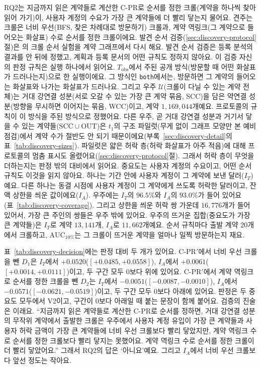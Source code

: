 RQ2는 지금까지 읽은 계약들로 계산한 \mbox{C-PR}로 순서를 정한 크롤(계약을 하나씩 찾아 읽어 가기)이, 사용자 계정의 수요가 가장 큰 계약들에 더 빨리 닿는지 물어요. 견주는 크롤은 너비 우선(BFS, 찾은 차례대로 방문하기) 크롤과, 계약 역링크(그 계약으로 들어오는 화살표) 수로 순서를 정한 크롤이에요. 발견 순서 검증(\ref{sec:discovery-protocol}절)은 \textcite{cho1998crawling}의 크롤 순서 실험을 계약 그래프에서 다시 해요. 발견 순서 검증은 등록 분석의 결과를 안 뒤에 정했고, 계획과 등록 문서의 어떤 규칙도 정하지 않아요. 이 검증 자신의 판정 규칙은 실행 하나에서 읽어요. $T_{\mathrm{obs}}$에서 주된 공개 방식(방문할 때 어떤 화살표가 드러나는지)으로 한 실행이에요. 그 방식인 \texttt{both}에서는, 방문하면 그 계약의 들어오는 화살표와 나가는 화살표가 드러나요. 그리고 우주 $\mathcal{U}$(크롤이 다닐 수 있는 계약 전체)는 거대 강연결 성분(서로 오갈 수 있는 가장 큰 계약 묶음, SCC)을 담은 약연결 성분(방향을 무시하면 이어지는 묶음, WCC)이고, 계약 $1{,}169{,}044$개예요. 프로토콜의 규칙이 이 방식을 주된 방식으로 정했어요. 다른 우주, 곧 거대 강연결 성분과 거기서 닿을 수 있는 계약들($\mathrm{SCC}\cup\mathrm{OUT}$)은 $t_1$의 구조 파일럿(무게 없이 그래프 모양만 본 예비 점검)에서 계약 수가 절반도 안 되기 때문이에요(부록~\ref{sec:discovery-detail}의 표~\ref{tab:discovery-sizes}). 파일럿은 얇은 허락 층(허락 화살표가 아주 적음)에 대해 프로토콜의 멈춤 표시도 올렸어요(\ref{sec:discovery-protocol}절). 그래서 허락 층이 무엇을 더하는지는 판정 밖의 대비에서 읽어요. 중요도는 사용자 계정의 수요이고, 어떤 순서 규칙도 이것을 읽지 않아요. 하나는 기간 안에 사용자 계정이 그 계약에 보낸 달러($I_T$)예요. 다른 하나는 동결 시점에 사용자 계정이 그 계약에게 쓰도록 허락한 달러이고, 잔액 상한을 씌운 값이에요($I_A$). 우주에는 $I_T$의 $96.5\%$와 $I_A$의 $93.0\%$가 들어 있어요(표~\ref{tab:discovery-coverage}). 그리고 상한을 씌운 허락 쌍 가운데 $16{,}776$개가 들어 있어서, 가장 큰 주인의 쌍들은 우주 밖에 있어요. 우주의 뜨거운 집합(중요도가 가장 큰 계약들)은 $I_T$로 계약 $13{,}141$개, $I_A$로 $11{,}662$개예요. 순서 규칙마다 출발 계약 $20$개에서 크롤하고, $\mathrm{AUC}_{10\%}$는 그 크롤이 뜨거운 계약을 얼마나 일찍 방문하는지 재요.

표~\ref{tab:discovery-decision}에는 판정 대비 두 개가 있어요. \mbox{C-PR}$'$에서 너비 우선 크롤을 뺀 $D_1$은 $I_T$에서 $+0.0520$($[+0.0485,+0.0558]$), $I_A$에서 $+0.0061$($[+0.0014,+0.0111]$)이고, 두 구간 모두 0보다 위에 있어요. \mbox{C-PR}$'$에서 계약 역링크로 순서를 정한 크롤을 뺀 $D_2$는 $I_T$에서 $-0.0051$($[-0.0087,-0.0010]$), $I_A$에서 $-0.0571$($[-0.0621,-0.0519]$)이고, 두 구간 모두 0보다 아래에 있어요. 판정은 두 중요도 모두에서 V2이고, 구간이 0보다 아래일 때 붙는 문장이 함께 붙어요. 검증의 진술은 이래요. “지금까지 읽은 계약들로 계산한 \mbox{C-PR}로 순서를 정하면, 거대 강연결 성분의 무작위 계약에서 출발한 크롤은 우주에서 사용자 계정 유입이 가장 큰 계약들과 사용자 허락 금액이 가장 큰 계약들에 너비 우선 크롤보다 빨리 닿았지만, 계약 역링크 수로 순서를 정한 크롤보다 빨리 닿지는 못했어요. 계약 역링크 수로 순서를 정한 크롤이 더 빨리 닿았어요.” 그래서 RQ2의 답은 ‘아니요’예요. 그리고 $I_A$에서 너비 우선 크롤보다 앞선 정도는 작아요.

